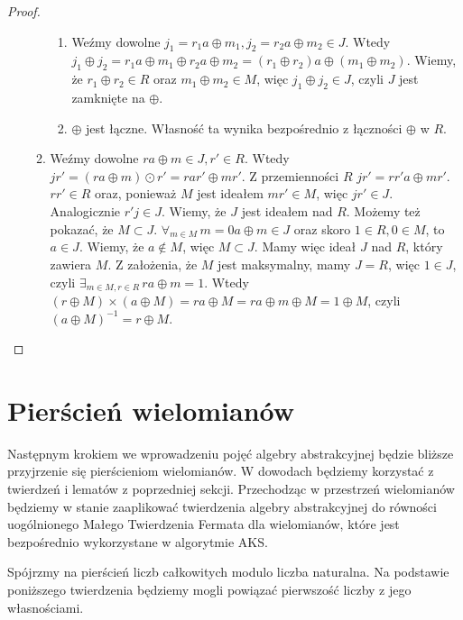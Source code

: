 \documentclass[polish,declaration,shortabstract]{iithesis}
\theoremstyle{definition}
\theoremstyle{remark} \newtheorem{observation}{Obserwacja}
\theoremstyle{plain} \newtheorem{theorem}{Twierdzenie}
\theoremstyle{plain} \newtheorem{lemma}{Lemat}
\theoremstyle{remark} \newtheorem*{remark*}{Uwaga}
\theoremstyle{reminder} \newtheorem*{reminder*}{Przypomnienie}
\begin{document}
\begin{proof}
\begin{enumerate}[label=(\arabic*),leftmargin=.4in]
\begin{enumerate}[label=(2.\arabic*)]
\begin{enumerate}[label=(2.1.\arabic*)]
		      	      	\item Weźmy dowolne $j_1 = r_1a \oplus m_1, j_2 = r_2a \oplus m_2 \in J$. Wtedy $j_1 \oplus j_2 = r_1a \oplus m_1 \oplus r_2a \oplus m_2 = (r_1 \oplus r_2)a \oplus (m_1 \oplus m_2)$. Wiemy, że $r_1 \oplus r_2 \in R$ oraz $m_1 \oplus m_2 \in M$, więc $j_1 \oplus j_2 \in J$, czyli $J$ jest zamknięte na $\oplus$.
		      	      	\item $\oplus$ jest łączne. Własność ta wynika bezpośrednio z łączności $\oplus$ w $R$.
		      	      \end{enumerate}
		      	\item Weźmy dowolne $ra \oplus m \in J, r' \in R$. Wtedy $jr' = (ra \oplus m) \odot r' = rar' \oplus mr'$. Z przemienności $R$ $jr' = rr'a \oplus mr'$. $rr' \in R$ oraz, ponieważ $M$ jest ideałem $mr' \in M$, więc $jr' \in J$. Analogicznie $r'j \in J$.
		      	      \newline
		      	      Wiemy, że $J$ jest ideałem nad $R$. Możemy też pokazać, że $M \subset J$. $\forall_{m \in M} \, m = 0a \oplus m \in J$ oraz skoro $1 \in R, 0 \in M$, to $a \in J$. Wiemy, że $a \notin M$, więc $M \subset J$.
		      	      \newline
		      	      Mamy więc ideał $J$ nad $R$, który zawiera $M$. Z założenia, że $M$ jest maksymalny, mamy $J = R$, więc $1 \in J$, czyli $\exists_{m \in M, r \in R} \, ra \oplus m = 1$. Wtedy $(r \oplus M) \times (a \oplus M) = ra \oplus M = ra \oplus m \oplus M = 1 \oplus M$, czyli $(a \oplus M)^{-1} = r \oplus M$.
		      \end{enumerate}
	\end{enumerate}
\end{proof}

\section{Pierścień wielomianów}

Następnym krokiem we wprowadzeniu pojęć algebry abstrakcyjnej będzie bliższe przyjrzenie się pierścieniom wielomianów. W dowodach będziemy korzystać z twierdzeń i lematów z poprzedniej sekcji. Przechodząc w przestrzeń wielomianów będziemy w stanie zaaplikować twierdzenia algebry abstrakcyjnej do równości uogólnionego Małego Twierdzenia Fermata dla wielomianów, które jest bezpośrednio wykorzystane w algorytmie AKS.

Spójrzmy na pierścień liczb całkowitych modulo liczba naturalna. Na podstawie poniższego twierdzenia będziemy mogli powiązać pierwszość liczby z jego własnościami.
\end{document}
